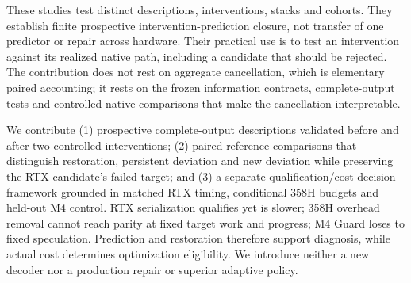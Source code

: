 These studies test distinct descriptions, interventions, stacks and cohorts. They establish finite prospective intervention-prediction closure, not transfer of one predictor or repair across hardware. Their practical use is to test an intervention against its realized native path, including a candidate that should be rejected. The contribution does not rest on aggregate cancellation, which is elementary paired accounting; it rests on the frozen information contracts, complete-output tests and controlled native comparisons that make the cancellation interpretable.

We contribute (1) prospective complete-output descriptions validated before and after two controlled interventions; (2) paired reference comparisons that distinguish restoration, persistent deviation and new deviation while preserving the RTX candidate's failed target; and (3) a separate qualification/cost decision framework grounded in matched RTX timing, conditional 358H budgets and held-out M4 control. RTX serialization qualifies yet is slower; 358H overhead removal cannot reach parity at fixed target work and progress; M4 Guard loses to fixed speculation. Prediction and restoration therefore support diagnosis, while actual cost determines optimization eligibility. We introduce neither a new decoder nor a production repair or superior adaptive policy.
